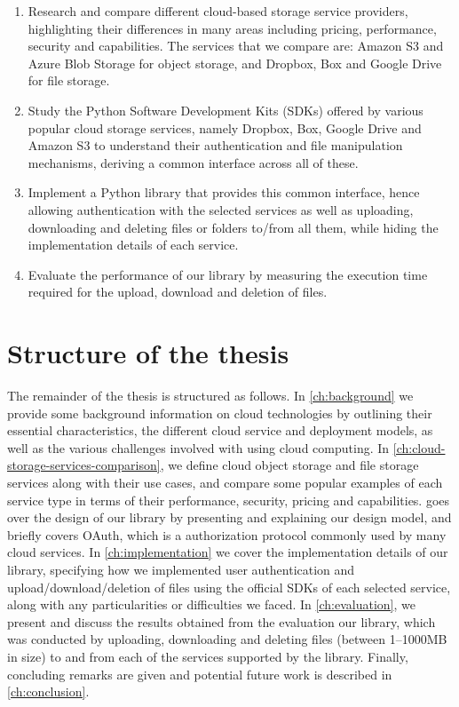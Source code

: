 \begin{enumerate}
    \item Research and compare different cloud-based storage service providers, highlighting their differences in many areas including pricing, performance, security and capabilities. The services that we compare are: Amazon S3 and Azure Blob Storage for object storage, and Dropbox, Box and Google Drive for file storage.

    \item Study the Python Software Development Kits (SDKs) offered by various popular cloud storage services, namely Dropbox, Box, Google Drive and Amazon S3 to understand their authentication and file manipulation mechanisms, deriving a common interface across all of these.

    \item Implement a Python library that provides this common interface, hence allowing authentication with the selected services as well as uploading, downloading and deleting files or folders to/from all them, while hiding the implementation details of each service.

    \item Evaluate the performance of our library by measuring the execution time required for the upload, download and deletion of files.
\end{enumerate}

\section{Structure of the thesis}
The remainder of the thesis is structured as follows. In \autoref{ch:background} we provide some background information on cloud technologies by outlining their essential characteristics, the different cloud service and deployment models, as well as the various challenges involved with using cloud computing. In \autoref{ch:cloud-storage-services-comparison}, we define cloud object storage and file storage services along with their use cases, and compare some popular examples of each service type in terms of their performance, security, pricing and capabilities.  goes over the design of our library by presenting and explaining our design model, and briefly covers OAuth, which is a authorization protocol commonly used by many cloud services. In \autoref{ch:implementation} we cover the implementation details of our library, specifying how we implemented user authentication and upload/download/deletion of files using the official SDKs of each selected service, along with any particularities or difficulties we faced. In \autoref{ch:evaluation}, we present and discuss the results obtained from the evaluation our library, which was conducted by uploading, downloading and deleting files (between 1--1000MB in size) to and from each of the services supported by the library. Finally, concluding remarks are given and potential future work is described in \autoref{ch:conclusion}.
